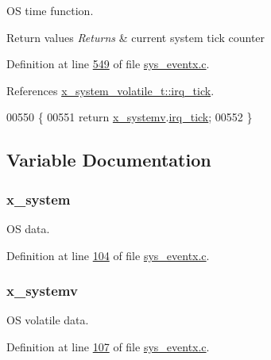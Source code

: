 O\+S time function. 


\begin{DoxyRetVals}{Return values}
{\em Returns} & current system tick counter \\
\hline
\end{DoxyRetVals}


Definition at line \hyperlink{a00037_source_l00549}{549} of file \hyperlink{a00037_source}{sys\+\_\+eventx.\+c}.



References \hyperlink{a00037_source_l00098}{x\+\_\+system\+\_\+volatile\+\_\+t\+::irq\+\_\+tick}.


\begin{DoxyCode}
00550 \{
00551     \textcolor{keywordflow}{return} \hyperlink{a00037_ad839c033d3d00cdcc6032038182be270}{x\_systemv}.\hyperlink{a00037_ab73fa103937ad39e7e2fc55783c4c370}{irq\_tick};
00552 \}
\end{DoxyCode}


\subsection{Variable Documentation}
\hypertarget{a00037_ae4d7967b507ca26e3ee1231215b03321}{
\subsubsection[{x\+\_\+system}]{ x\+\_\+system}}\label{a00037_ae4d7967b507ca26e3ee1231215b03321}


O\+S data. 



Definition at line \hyperlink{a00037_source_l00104}{104} of file \hyperlink{a00037_source}{sys\+\_\+eventx.\+c}.

\hypertarget{a00037_ad839c033d3d00cdcc6032038182be270}{
\subsubsection[{x\+\_\+systemv}]{ x\+\_\+systemv}}\label{a00037_ad839c033d3d00cdcc6032038182be270}


O\+S volatile data. 



Definition at line \hyperlink{a00037_source_l00107}{107} of file \hyperlink{a00037_source}{sys\+\_\+eventx.\+c}.

